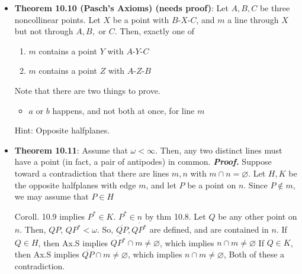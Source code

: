 \documentclass{report}
\begin{document}
\begin{itemize}
        \item \textbf{Theorem 10.10 (Pasch's Axioms) (needs proof)}: 
            Let $A,B,C$ be three noncollinear points. Let $X$ be a point with $ B\text{-}X\text{-}C $, and $m$ a line through $X$ but not through $A,B,$ or $C$. Then, exactly one of
            \begin{enumerate}
                \item $m$ contains a point $Y$ with $ A\text{-}Y\text{-}C$
                \item $m$ contains a point $Z$ with $ A\text{-}Z\text{-}B $
            \end{enumerate}
            \bigbreak \noindent 
            \begin{figure}[ht]
                \centering
                \label{fig:pasch}
            \end{figure}
            \bigbreak \noindent 
            Note that there are two things to prove.
            \begin{itemize}
                \item $a$ or $b$ happens, and not both at once, for line $m$
            \end{itemize}
            Hint: Opposite halfplanes.
        \item \textbf{Theorem 10.11}: Assume that $\omega < \infty$. Then, any two distinct lines must have a point (in fact, a pair of antipodes) in common.
            \bigbreak \noindent 
            \textbf{\textit{Proof.}} Suppose toward a contradiction that there are lines $m,n$ with $m \cap n = \varnothing $. Let $H,K$ be the opposite halfplanes with edge $m$, and let $P$ be a point on $n$. Since $P \not\in m$, we may assume that $P \in H $
            \bigbreak \noindent 
            \begin{figure}[ht]
                \centering
                \label{fig:lines}
            \end{figure}
            \bigbreak \noindent 
            Coroll. 10.9 implies $P^{*} \in K$. $P^{*} \in n$ by thm 10.8. Let $Q$ be any other point on $n$. Then, $QP$, $QP^{*} < \omega$. So, $\overline{QP}, \overline{QP^{*}}$ are defined, and are contained in $n$. 
            \bigbreak \noindent 
            If $Q \in H$, then Ax.S implies $\overline{QP^{*}} \cap m \ne \varnothing$, which implies $n\cap m \ne \varnothing $
            \bigbreak \noindent 
            If $ Q\in K$, then Ax.S implies $\overline{QP} \cap m \ne \varnothing$, which implies $n \cap m \ne \varnothing $,
            \bigbreak \noindent 
            Both of these a contradiction.



    \end{itemize}
\end{document}
